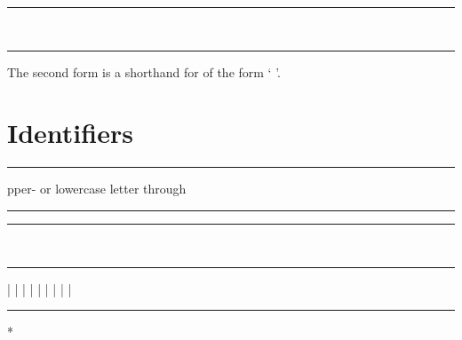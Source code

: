 \begin{grammar}
\rule{tuple-literal-element}  \code{:} \\
\rule{tuple-literal-element} 
\end{grammar}

The second form is a shorthand for  of the
form ` \code{:} '.

\section{Identifiers}

\begin{grammar}
\rule{identifier-first-character} upper- or lowercase letter  through \\
\rule{identifier-first-character} \code{_}

\rule{identifier-character} \\
\rule{identifier-character}  |  |  |  |  |  |  |  |  | 

\rule{identifier}  *
\end{grammar}
